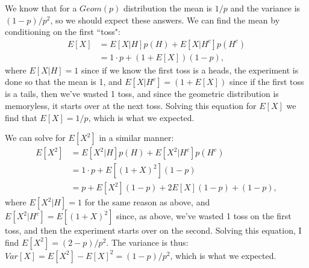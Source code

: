 \begin{problem}{7} We know that for a $Geom(p)$ distribution the mean is $1/p$ and the variance is $(1-p)/p^2$, so we should expect these answers.  We can find the mean by conditioning on the first ``toss":
\begin{align*}
E[X] &= E[X|H]p(H)+E[X|H^c]p(H^c) \\
&= 1\cdot p+(1+E[X])(1-p),
\end{align*}
where $E[X|H]=1$ since if we know the first toss is a heads, the experiment is done so that the mean is 1, and $E[X|H^c] =(1+E[X])$ since if the first toss is a tails, then we've wasted 1 toss, and since the geometric distribution is memoryless, it starts over at the next toss.  Solving this equation for $E[X]$ we find that $E[X] =1/p$, which is what we expected.

We can solve for $E[X^2]$ in a similar manner:
\begin{align*}
E[X^2] &= E[X^2|H]p(H)+E[X^2|H^c]p(H^c) \\
&= 1\cdot p+E[(1+X)^2](1-p) \\
&= p+E[X^2](1-p)+2E[X](1-p)+(1-p),
\end{align*}
where $E[X^2|H]=1$ for the same reason as above, and $E[X^2|H^c] = E[(1+X)^2]$ since, as above, we've wasted 1 toss on the first toss, and then the experiment starts over on the second.  Solving this equation, I find $E[X^2] = (2-p)/p^2$.  The variance is thus: $Var[X] = E[X^2]-E[X]^2 = (1-p)/p^2$, which is what we expected.

\end{problem}

